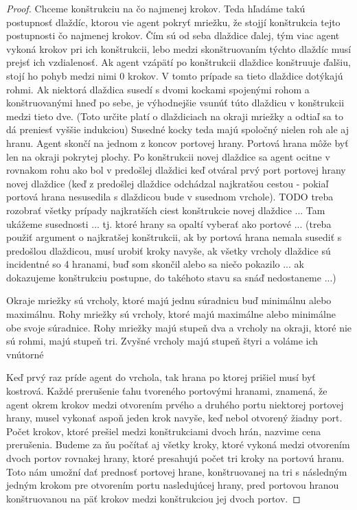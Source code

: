 \begin{proof}
Chceme konštrukciu na čo najmenej krokov. Teda hľadáme takú postupnosť
dlaždíc, ktorou vie agent pokryť mriežku, že stojjí konštrukcia tejto
postupnosti čo najmenej krokov.
Čím sú od seba dlaždice ďalej, tým viac agent vykoná krokov pri ich
konštrukcii, lebo medzi skonštruovaním týchto dlaždíc musí prejsť ich
vzdialenosť.
Ak agent vzápätí po konštrukcii dlaždice konštruuje ďalšiu, stojí ho pohyb
medzi nimi 0 krokov. V tomto prípade sa tieto dlaždice dotýkajú rohmi.
Ak niektorá dlaždica susedí s dvomi kockami spojenými rohom a konštruovanými
hneď po sebe, je výhodnejšie vsunúť túto dlaždicu v konštrukcii medzi tieto
dve. (Toto určite platí o dlaždiciach na okraji mriežky a odtiaľ sa to dá
preniesť vyššie indukciou)
Susedné kocky teda majú spoločný nielen roh ale aj hranu. Agent skončí na
jednom z koncov portovej hrany. Portová hrana môže byť len na okraji
pokrytej plochy.
Po konštrukcii novej dlaždice sa agent ocitne v rovnakom rohu ako bol v
predošlej dlaždici keď otváral prvý port portovej hrany novej dlaždice (keď
z predošlej dlaždice odchádzal najkratšou cestou - pokiaľ portová hrana
nesusedila s dlaždicou bude v susednom vrchole).
TODO treba rozobrať všetky prípady najkratších ciest konštrukcie novej
dlaždice ...
Tam ukážeme susednosti ... tj. ktoré hrany sa opaltí vyberať ako portové ...
(treba použiť argument o najkratšej konštrukcii, ak by portová hrana nemala
susediť s predošlou dlaždicou, musí urobiť kroky navyše, ak všetky vrcholy
dlaždice sú incidentné so 4 hranami, buď som skončil alebo sa niečo pokazilo
... ak dokazujeme konštrukciu postupne, do takéhoto stavu sa snáď
nedostaneme ...) 
\fi
\begin{ozn}
Okraje mriežky sú vrcholy, ktoré majú jednu súradnicu buď minimálnu alebo
maximálnu. Rohy mriežky sú vrcholy, ktoré majú maximálne alebo minimálne obe
svoje súradnice.
Rohy mriežky majú stupeň dva a vrcholy na okraji, ktoré nie sú rohmi, majú
stupeň tri.
Zvyšné vrcholy majú stupeň štyri a voláme ich vnútorné
\end{ozn}

Keď prvý raz príde agent do vrchola, tak hrana po ktorej prišiel musí byť
kostrová.
Každé prerušenie ťahu tvoreného portovými hranami, znamená, že agent okrem
krokov medzi otvorením prvého a druhého portu niektorej portovej hrany,
musel vykonať aspoň jeden krok navyše, keď nebol otvorený žiadny port. 
Počet krokov, ktoré prešiel medzi konštrukciami dvoch hrán, nazvime 
cena prerušenia. Budeme za ňu počítať aj všetky kroky, ktoré vykoná medzi
otvorením dvoch portov rovnakej hrany, ktoré presahujú počet tri kroky na
portovú hranu. Toto nám umožní dať prednosť portovej hrane, konštruovanej na
tri s následným jedným krokom pre otvorením portu nasledujúcej hrany, pred
portovou hranou konštruovanou na päť krokov medzi konštrukciou jej dvoch
portov.


\end{proof}
